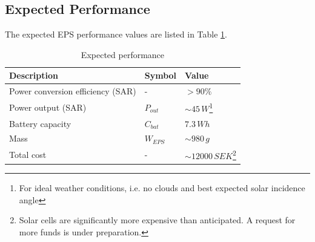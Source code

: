 \subsection{Expected Performance}
The expected \ac{EPS} performance values are listed in Table \ref{tab:expected_performance}.
%
\begin{table}[H]
\centering
\caption{Expected performance}
\label{tab:expected_performance}
\begin{minipage}{\textwidth}
\begin{tabular}{p{}p{}p{}}
\hline
\textbf{Description} & \textbf{Symbol} & \textbf{Value}\\
\hline
Power conversion efficiency (SAR) & - & $>90\%$\\
Power output (SAR) & $P_{out}$ & $\sim 45\,W$\footnote{For ideal weather conditions, i.e. no clouds and best expected solar incidence angle}\\
Battery capacity & $C_{bat}$ & $7.3\,Wh$\\
Mass & $W_{EPS}$ & $\sim980\,g$\\
Total cost & - & $\sim12000\,SEK$\footnote{Solar cells are significantly more expensive than anticipated. A request for more funds is under preparation.}\\
\hline
\end{tabular}\par
\vspace{-0.75\skip\footins}
\renewcommand{\footnoterule}{}
\end{minipage}
\end{table}
%
%
